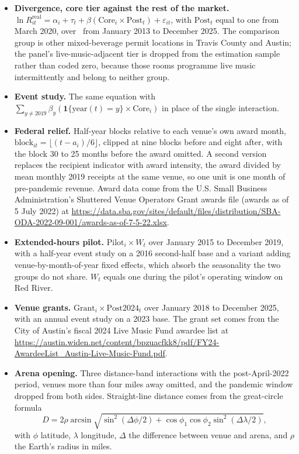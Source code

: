 \begin{itemize}
\item \textbf{Divergence, core tier against the rest of the market.}
      \(\ln R^{\mathrm{real}}_{it} = \alpha_i + \tau_t
        + \beta(\mathrm{Core}_i \times \mathrm{Post}_t) + \varepsilon_{it}\),
      with \(\mathrm{Post}_t\) equal to one from March 2020, over
      \NVenueDidN\ from January 2013 to December 2025. The comparison group
      is other mixed-beverage permit locations in Travis County and Austin;
      the panel's live-music-adjacent tier is dropped from the estimation
      sample rather than coded zero, because those rooms programme live
      music intermittently and belong to neither group.
\item \textbf{Event study.} The same equation with
      \(\sum_{y \neq 2019}\beta_y(\mathbf{1}\{\mathrm{year}(t)=y\}
        \times \mathrm{Core}_i)\) in place of the single interaction.
\item \textbf{Federal relief.} Half-year blocks relative to each venue's own
      award month, \(\mathrm{block}_{it} = \lfloor (t-a_i)/6 \rfloor\),
      clipped at nine blocks before and eight after, with the block 30 to
      25 months before the award omitted. A second version replaces the
      recipient indicator with award intensity, the award divided by mean
      monthly 2019 receipts at the same venue, so one unit is one month of
      pre-pandemic revenue. Award data come from the U.S. Small Business
      Administration's Shuttered Venue Operators Grant awards file (awards
      as of 5 July 2022) at
      \url{https://data.sba.gov/sites/default/files/distribution/SBA-ODA-2022-09-001/awards-as-of-7-5-22.xlsx}.
\item \textbf{Extended-hours pilot.}
      \(\mathrm{Pilot}_i \times W_t\) over January 2015 to December 2019,
      with a half-year event study on a 2016 second-half base and a variant
      adding venue-by-month-of-year fixed effects, which absorb the
      seasonality the two groups do not share. \(W_t\) equals one during
      the pilot's operating window on Red River.
\item \textbf{Venue grants.} \(\mathrm{Grant}_i \times \mathrm{Post2024}_t\)
      over January 2018 to December 2025, with an annual event study on a
      2023 base. The grant set comes from the City of Austin's fiscal 2024
      Live Music Fund awardee list at
      \url{https://austin.widen.net/content/bpzuacfkk8/pdf/FY24-AwardeeList_Austin-Live-Music-Fund.pdf}.
\item \textbf{Arena opening.} Three distance-band interactions with the
      post-April-2022 period, venues more than four miles away omitted, and
      the pandemic window dropped from both sides. Straight-line distance
      comes from the great-circle formula
      \[
      D = 2\rho\arcsin\sqrt{\sin^{2}(\Delta\phi/2)
        + \cos\phi_1\cos\phi_2\sin^{2}(\Delta\lambda/2)},
      \]
      with \(\phi\) latitude, \(\lambda\) longitude, \(\Delta\) the
      difference between venue and arena, and \(\rho\) the Earth's radius
      in miles.
\end{itemize}

